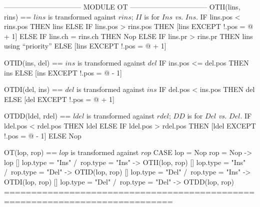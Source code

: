 \documentclass{article}
\begin{document}
\begin{tla}
--------------------------------- MODULE OT ---------------------------------
OTII(lins, rins) == \* $lins$ is transformed against $rins$; $II$ is for $Ins$ \emph{vs.} $Ins$.
    IF lins.pos < rins.pos THEN lins
    ELSE IF lins.pos > rins.pos
         THEN [lins EXCEPT !.pos = @ + 1]
         ELSE IF lins.ch = rins.ch THEN Nop
              ELSE IF lins.pr > rins.pr THEN lins \* using ``priority''
                   ELSE [lins EXCEPT !.pos = @ + 1]

OTID(ins, del) == \* $ins$ is transformed against $del$
    IF ins.pos <= del.pos THEN ins
    ELSE [ins EXCEPT !.pos = @ - 1]

OTDI(del, ins) == \* $del$ is transformed against $ins$
    IF del.pos < ins.pos THEN del
    ELSE [del EXCEPT !.pos = @ + 1]

OTDD(ldel, rdel) == \* $ldel$ is transformed against $rdel$; $DD$ is for $Del$ \emph{vs.} $Del$.
    IF ldel.pos < rdel.pos THEN ldel
    ELSE IF ldel.pos > rdel.pos
         THEN [ldel EXCEPT !.pos = @ - 1]
         ELSE Nop

OT(lop, rop) == \* $lop$ is transformed against $rop$
    CASE lop = Nop \/ rop = Nop -> lop
       []  lop.type = "Ins" /\ rop.type = "Ins" -> OTII(lop, rop)
       []  lop.type = "Ins" /\ rop.type = "Del" -> OTID(lop, rop)
       []  lop.type = "Del" /\ rop.type = "Ins" -> OTDI(lop, rop)
       []  lop.type = "Del" /\ rop.type = "Del" -> OTDD(lop, rop)
=============================================================================
\end{tla}
\end{document}
